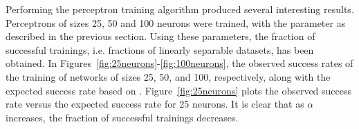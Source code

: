 Performing the perceptron training algorithm produced several interesting results.
Perceptrons of sizes 25, 50 and 100 neurons were trained, with the parameter as described in the previous section. 
Using these parameters, the fraction of successful trainings, i.e. fractions of linearly separable datasets, has been obtained. 
In Figures~\ref{fig:25neurons}-\ref{fig:100neurons}, the observed success rates of the training of networks of sizes 25, 50, and 100, respectively, along with the expected success rate based on \cite{perceptron_slides2}.
Figure~\ref{fig:25neurons} plots the observed success rate versus the expected success rate for 25 neurons.
It is clear that as \(\alpha\) increases, the fraction of successful trainings decreases.
